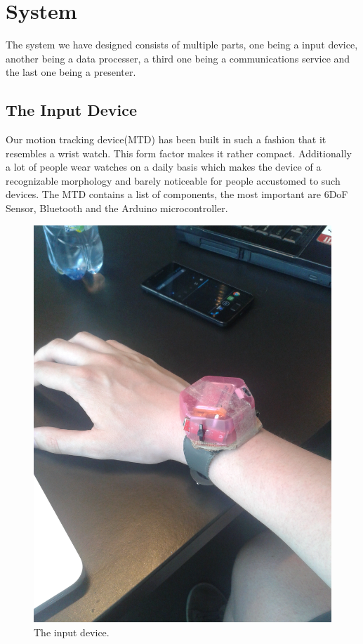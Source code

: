 \section{System}
The system we have designed consists of multiple parts,
one being a input device, another being a data processer, 
a third one being a communications service and the last one being a presenter.

\subsection{The Input Device}
Our motion tracking device(MTD) has been built in such a fashion that it resembles a wrist watch.
This form factor makes it rather compact.
Additionally a lot of people wear watches on a daily basis which makes the device of a recognizable morphology and barely noticeable for people accustomed to such devices.
The MTD contains a list of components, the most important are 6DoF Sensor, Bluetooth and the Arduino microcontroller.

\begin{figure}[!h]
\centering
\includegraphics[width=0.9\columnwidth]{img/watch}
\caption{The input device.}
\label{fig:figure5}
\end{figure}

